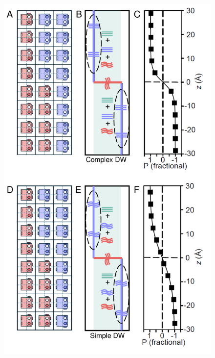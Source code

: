 \documentclass[12pt]{article}
\begin{document}
\begin{figure}
\begin{center}
  \includegraphics[scale=0.3]{Figure3.pdf}

\end{center}
\end{figure}
\end{document}
